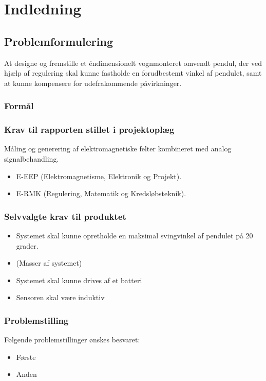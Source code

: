 \chapter{Indledning}

\section{Problemformulering}
At designe og fremstille et éndimensionelt vognmonteret omvendt pendul, der ved hjælp af regulering skal kunne fastholde en forudbestemt vinkel af pendulet, samt at kunne kompensere for udefrakommende påvirkninger. 

\subsection{Formål}

\subsection{Krav til rapporten stillet i projektoplæg}
Måling og generering af elektromagnetiske felter kombineret med analog signalbehandling.
\begin{itemize}
\item E-EEP (Elektromagnetisme, Elektronik og Projekt).
\item E-RMK (Regulering, Matematik og Kredsløbsteknik).
\end{itemize}

\subsection{Selvvalgte krav til produktet} \label{afs:kravspecifikation}
\begin{itemize}
\item Systemet skal kunne opretholde en maksimal svingvinkel af pendulet på 20 grader.
\item (Masser af systemet)
\item Systemet skal kunne drives af et batteri
\item Sensoren skal være induktiv
\end{itemize}

\subsection{Problemstilling}
Følgende problemstillinger ønskes besvaret:
\begin{itemize}
\item Første
\item Anden
\end{itemize}

